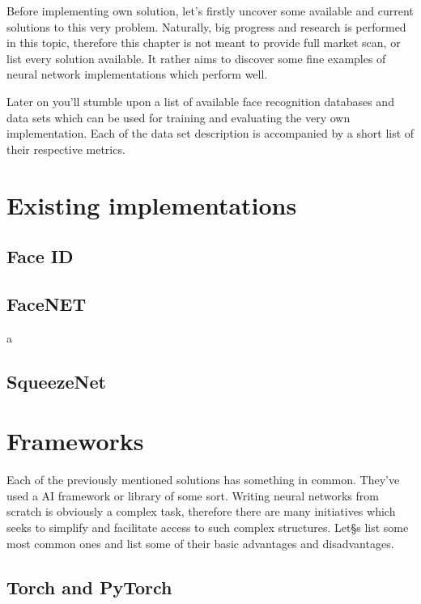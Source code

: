 Before implementing own solution, let's firstly uncover some available and current solutions to this very problem. Naturally, big progress and research is performed in this topic, therefore this chapter is not meant to provide full market scan, or list every solution available. It rather aims to discover some fine examples of neural network implementations which perform well.

Later on you'll stumble upon a list of available face recognition databases and data sets which can be used for training and evaluating the very own implementation. Each of the data set description is accompanied by a short list of their respective metrics.

\section{Existing implementations}



\subsection{Face ID}

\subsection{FaceNET}

a\cite{facenet}\cite{vgg_face_reco}

\subsection{SqueezeNet}
\cite{squeezenet}

\section{Frameworks}

Each of the previously mentioned solutions has something in common. They've used a AI framework or library of some sort. Writing neural networks from scratch is obviously a complex task, therefore there are many initiatives which seeks to simplify and facilitate access to such complex structures. Let§s list some most common ones and list some of their basic advantages and disadvantages.

\subsection{Torch and PyTorch}

